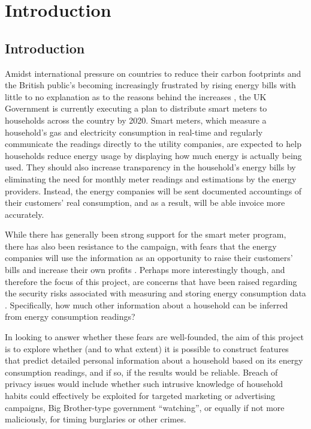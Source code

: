 \chapter{Introduction}
\section{Introduction}
Amidst international pressure on countries to reduce their carbon footprints \cite{E_spending} and the British public's becoming increasingly frustrated by rising energy bills with little to no explanation as to the reasons behind the increases \cite{E_spending}, the UK Government is currently executing a plan to distribute smart meters to households across the country by 2020. Smart meters, which measure a household's gas and electricity consumption in real-time and regularly communicate the readings  directly to the utility companies, are expected to help households reduce energy usage by displaying how much energy is actually being used. They should also increase transparency in the household's energy bills by eliminating the need for monthly meter readings and estimations by the energy providers. Instead, the energy companies will be sent documented accountings of their customers' real consumption, and as a result, will be able invoice more accurately.

While there has generally been strong support for the smart meter program, there has also been resistance to the campaign, with fears that the energy companies will use the information as an opportunity to raise their customers' bills and increase their own profits \cite{stop}. Perhaps more interestingly though, and therefore the focus of this project, are concerns that have been raised regarding the security risks associated with measuring and storing energy consumption data \cite{Quinn} \cite{LMW}. Specifically, how much other information about a household can be inferred from energy consumption readings? 

In looking to answer whether these fears are well-founded, the aim of this project is to explore whether (and to what extent) it is
possible to construct features that predict detailed personal information about a household based on its energy consumption readings, and if so, if the results would be reliable. Breach of privacy issues would include whether such intrusive knowledge of household habits could effectively be exploited for targeted marketing or advertising campaigns, Big Brother-type government “watching”, or equally if not more maliciously, for timing burglaries or other crimes. 

